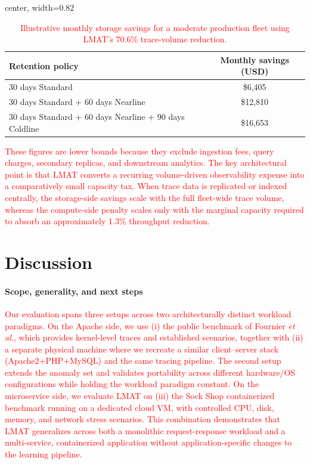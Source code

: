 \documentclass[preprint,12pt]{elsarticle}
\begin{document}
\begin{table}[tb]
\centering
\caption{\textcolor{red}{Illustrative monthly storage savings for a moderate production fleet using LMAT's 70.6\% trace-volume reduction.}}
\label{tab:lmat_cost_example}
{\color{red}
\begin{adjustbox}{center, width=0.82\textwidth}
\begin{tabular}{l c}
\toprule
Retention policy & Monthly savings (USD) \\
\midrule
30 days Standard & \$6,405 \\
30 days Standard + 60 days Nearline & \$12,810 \\
30 days Standard + 60 days Nearline + 90 days Coldline & \$16,653 \\
\bottomrule
\end{tabular}
\end{adjustbox}
}
\end{table}

\textcolor{red}{These figures are lower bounds because they exclude ingestion fees, query charges, secondary replicas, and downstream analytics. The key architectural point is that LMAT converts a recurring volume-driven observability expense into a comparatively small capacity tax. When trace data is replicated or indexed centrally, the storage-side savings scale with the full fleet-wide trace volume, whereas the compute-side penalty scales only with the marginal capacity required to absorb an approximately 1.3\% throughput reduction.}
\section{Discussion}
\label{sec:discussion}


\paragraph{Scope, generality, and next steps}
\textcolor{red}{Our evaluation spans three setups across two architecturally distinct workload paradigms. On the Apache side, we use (i) the public benchmark of Fournier \emph{et al.}\cite{fournier2023language}, which provides kernel-level traces and established scenarios, together with (ii) a separate physical machine where we recreate a similar client–server stack (Apache2+PHP+MySQL) and the same tracing pipeline. The second setup extends the anomaly set and validates portability across different hardware/OS configurations while holding the workload paradigm constant. On the microservice side, we evaluate LMAT on (iii) the Sock Shop containerized benchmark running on a dedicated cloud VM, with controlled CPU, disk, memory, and network stress scenarios. This combination demonstrates that LMAT generalizes across both a monolithic request-response workload and a multi-service, containerized application without application-specific changes to the learning pipeline.}
\end{document}
